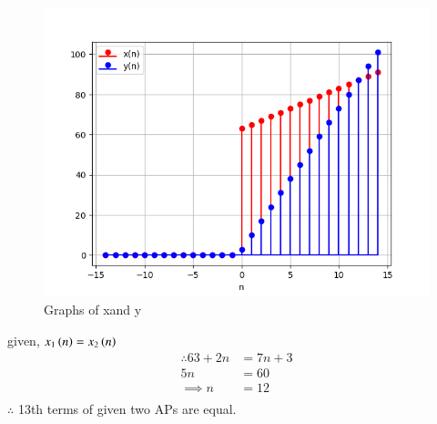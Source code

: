 \documentclass[journal,12pt,twocolumn]{IEEEtran}
\theoremstyle{remark}
\begin{document}
\begin{enumerate}
\begin{enumerate}
\begin{figure}[ht]
    \includegraphics[width = \linewidth]{Figure_1.png}
    \caption{Graphs of xand y}
    \label{Fig:1}
\end{figure}
given, $ x_1\left(n\right) = x_2\left(n\right)$\\
\begin{align}
\therefore 63 + 2n &= 7n+3\\
5n &= 60\\
\implies n &= 12\\
\end{align}
$ \therefore$ 13th terms of given two APs are equal.\\\\
\end{enumerate}
\end{enumerate}
\end{document}
